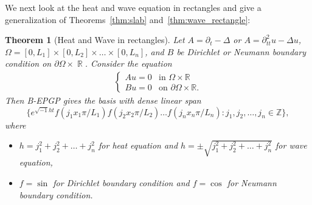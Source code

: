 \documentclass{article} %
\theoremstyle{plain}
\newtheorem{theorem}{Theorem}[section]
\theoremstyle{definition}
\theoremstyle{remark}
\DeclareMathOperator*{\R}{\mathbb{R}}
\newcommand{\RR}{\mathbb{R}}
\begin{document}
We next look at the heat and wave equation in rectangles and give a generalization of Theorems~\ref{thm:slab} and~\ref{thm:wave_rectangle}:
\begin{theorem}[Heat and Wave in rectangles]\label{thm:heat_wave_rectangle}
    Let $A=\partial_{t}-\Delta $ or $A=\partial^2_{tt}u-\Delta u$, $\Omega=[0,L_1]\times[0,L_2]\times\ldots \times[0,L_n]$, and $B$ be Dirichlet or Neumann boundary condition on $\partial\Omega\times\R$. Consider the equation
    \begin{align*}
        \begin{cases}
            Au=0&\text{in }\Omega\times\RR\\
            Bu=0&\text{on }\partial\Omega\times\RR.
        \end{cases}
    \end{align*}
    Then B-EPGP gives the  basis with dense linear span
    $$
    \{e^{\sqrt{-1}ht}f(j_1x_1\pi/L_1)f(j_2x_2\pi/L_2)\ldots f(j_nx_n\pi/L_n)\colon j_1,j_2,\ldots,j_n\in\mathbb Z\},
    $$
    where
    \begin{itemize}
        \item $h=j_1^2+j_2^2+\ldots+j_n^2$ for heat equation and $h=\pm\sqrt{j_1^2+j_2^2+\ldots+j_n^2}$ for wave equation,
        \item $f=\sin$ for Dirichlet boundary condition and $f=\cos$ for Neumann boundary condition.
    \end{itemize}
\end{theorem}
\end{document}
